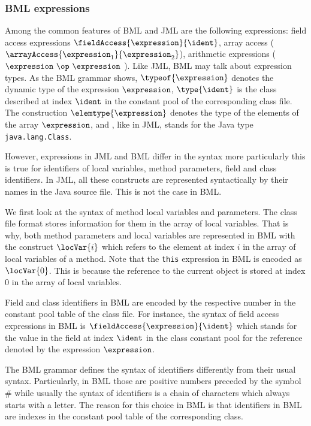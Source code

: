 \subsubsection{BML expressions}
Among the common features of BML and JML are the following expressions:
field access expressions $\fieldAccess{ \expression}{\ident}$, array access  
($\arrayAccess{\expression_1} {\expression_2} $),  arithmetic expressions
($\expression \ \op \ \expression$ ). Like JML, BML may talk about expression types.
As the BML grammar shows,  $ \typeof{\expression}$  denotes the dynamic type of the expression $\expression$, 
 $ \type{ \ident } $  is the class  described at index $\ident$ in the constant pool of the corresponding class file.
The construction $\elemtype{\expression}$ denotes the type of the elements of the array $\expression$,
and \TYPE, like in JML, stands for the Java type \texttt{java.lang.Class}. 

However, expressions in JML and BML differ in the syntax more particularly this is true for identifiers 
of local variables, method parameters, field and class identifiers. In JML, all these constructs
 are represented syntactically by their names in the Java source file. This is not the case in BML.

 We first look at the syntax of method local variables and parameters.
 The class file format stores information for them in the array of local variables.
 That is why, both method parameters and local variables are represented in BML 
 with the construct  $\locVar{i}$ which refers to the element at index $i$ in the array of local
 variables of a method. Note that the \texttt{this} expression in BML is encoded
 as $\locVar{0}$. This is because the reference to the current object is stored at index 0 in the array of local variables.

 
 Field and class identifiers in BML are encoded by the respective number in the constant pool table of the class file.
 For instance, the syntax of field access expressions  in BML is $\fieldAccess{\expression}{\ident}$ which 
 stands for the value in the field at index $\ident$ in the class constant pool 
 for the reference denoted by the expression  $ \expression $. 

 The BML grammar defines the syntax of identifiers differently from their usual syntax.
 Particularly, in BML those are positive numbers preceded by the symbol \# while usually
 the syntax of identifiers is a chain of characters which always starts with a letter. 
 The reason for this choice in BML  is that identifiers in BML are indexes in the constant
 pool table of the corresponding class.     

